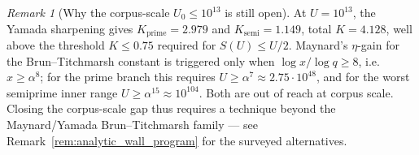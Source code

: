 \documentclass[11pt]{article}
\renewcommand{\_}{\origunderscore\allowbreak}
\theoremstyle{definition}
\theoremstyle{remark}
\newtheorem{remark}[theorem]{Remark}
\begin{document}
\begin{remark}[Why the corpus-scale $U_{0}\le 10^{13}$ is still open]\label{rem:l2b_corpus_obstruction}
At $U=10^{13}$, the Yamada sharpening gives
$K_{\mathrm{prime}}=2.979$ and $K_{\mathrm{semi}}=1.149$, total
$K=4.128$, well above the threshold $K\le 0.75$ required for
$S(U)\le U/2$.  Maynard's $\eta$-gain for the Brun--Titchmarsh
constant is triggered only when $\log x/\log q\ge 8$, i.e.\
$x\ge \alpha^{8}$; for the prime branch this requires
$U\ge\alpha^{7}\approx 2.75\cdot 10^{48}$, and for the worst
semiprime inner range $U\ge\alpha^{15}\approx 10^{104}$.  Both
are out of reach at corpus scale.  Closing the corpus-scale
gap thus requires a technique beyond the Maynard/Yamada
Brun--Titchmarsh family --- see Remark~\ref{rem:analytic_wall_program}
for the surveyed alternatives.
\end{remark}
\end{document}
